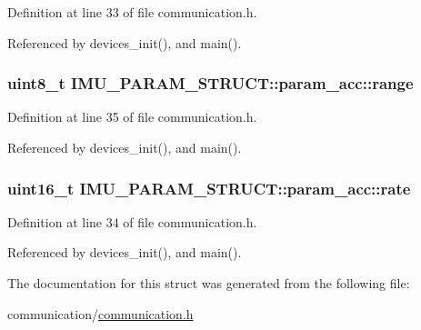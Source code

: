 Definition at line 33 of file communication.\-h.



Referenced by devices\-\_\-init(), and main().

\hypertarget{structIMU__PARAM__STRUCT_1_1param__acc_a26199b298ef2d353192dfbc706bce8cf}{
\subsubsection[{range}]{\setlength{\rightskip}{0pt plus 5cm}uint8\-\_\-t I\-M\-U\-\_\-\-P\-A\-R\-A\-M\-\_\-\-S\-T\-R\-U\-C\-T\-::param\-\_\-acc\-::range}}\label{structIMU__PARAM__STRUCT_1_1param__acc_a26199b298ef2d353192dfbc706bce8cf}


Definition at line 35 of file communication.\-h.



Referenced by devices\-\_\-init(), and main().

\hypertarget{structIMU__PARAM__STRUCT_1_1param__acc_a30e6a318cad098cd8379416705820f95}{
\subsubsection[{rate}]{\setlength{\rightskip}{0pt plus 5cm}uint16\-\_\-t I\-M\-U\-\_\-\-P\-A\-R\-A\-M\-\_\-\-S\-T\-R\-U\-C\-T\-::param\-\_\-acc\-::rate}}\label{structIMU__PARAM__STRUCT_1_1param__acc_a30e6a318cad098cd8379416705820f95}


Definition at line 34 of file communication.\-h.



Referenced by devices\-\_\-init(), and main().



The documentation for this struct was generated from the following file\-:\begin{DoxyCompactItemize}
\item 
communication/\hyperlink{communication_2communication_8h}{communication.\-h}\end{DoxyCompactItemize}
